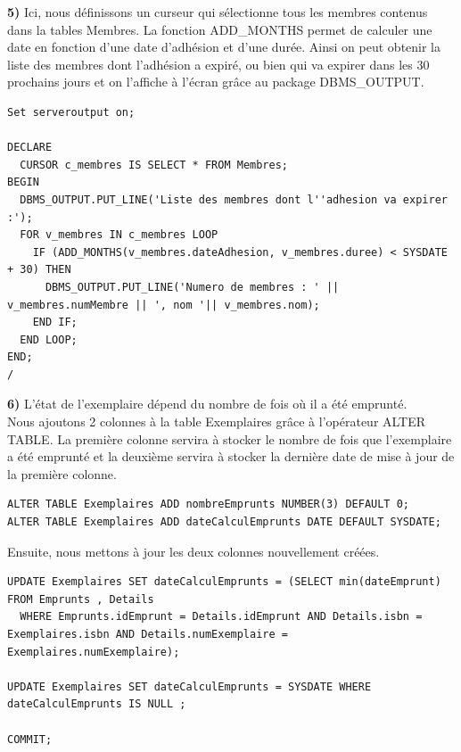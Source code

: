 \documentclass[a4paper,12pt]{article}
\begin{document}
      \textbf {5)} Ici, nous définissons un curseur qui sélectionne tous les membres contenus dans la tables Membres. La fonction ADD\_MONTHS permet de calculer une date en fonction d'une date d'adhésion et d'une durée. Ainsi on peut obtenir la liste des membres dont l’adhésion a expiré, ou bien qui va expirer dans les 30 prochains jours et on l'affiche à l'écran grâce au package DBMS\_OUTPUT.
      
      \begin{lstlisting}
Set serveroutput on;

DECLARE
  CURSOR c_membres IS SELECT * FROM Membres;
BEGIN
  DBMS_OUTPUT.PUT_LINE('Liste des membres dont l''adhesion va expirer :');
  FOR v_membres IN c_membres LOOP
    IF (ADD_MONTHS(v_membres.dateAdhesion, v_membres.duree) < SYSDATE + 30) THEN
      DBMS_OUTPUT.PUT_LINE('Numero de membres : ' || v_membres.numMembre || ', nom '|| v_membres.nom);
    END IF;
  END LOOP;
END;
/
      \end{lstlisting}
      \clearpage
      \textbf {6)} L'état de l'exemplaire dépend du nombre de fois où il a été emprunté. \\
      Nous ajoutons 2 colonnes à la table Exemplaires grâce à l'opérateur ALTER TABLE. La première colonne servira à stocker le nombre de fois que l'exemplaire a été emprunté et la deuxième servira à stocker la dernière date de mise à jour de la première colonne.
      
      \begin{lstlisting}
ALTER TABLE Exemplaires ADD nombreEmprunts NUMBER(3) DEFAULT 0;
ALTER TABLE Exemplaires ADD dateCalculEmprunts DATE DEFAULT SYSDATE;

      \end{lstlisting}

		Ensuite, nous mettons à jour les deux colonnes nouvellement créées.
      \begin{lstlisting}
UPDATE Exemplaires SET dateCalculEmprunts = (SELECT min(dateEmprunt) FROM Emprunts , Details 
  WHERE Emprunts.idEmprunt = Details.idEmprunt AND Details.isbn = Exemplaires.isbn AND Details.numExemplaire = Exemplaires.numExemplaire);

UPDATE Exemplaires SET dateCalculEmprunts = SYSDATE WHERE dateCalculEmprunts IS NULL ;

COMMIT;

      \end{lstlisting}
\end{document}
